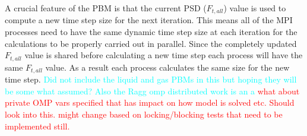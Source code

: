 \documentclass[preprint,11pt,authoryear]{elsarticle}
\begin{document}
    \par A crucial feature of the PBM is that the current PSD ($F_{t,all}$) value is used to compute a new time step size for the next iteration. This means all of the MPI processes need to have the same dynamic time step size at each iteration for the calculations to be properly carried out in parallel. Since the completely updated $F_{t,all}$ value is shared before calculating a new time step each process will have the same $F_{t,all}$ value. As a result each process calculates the same size for the new time step. 
\textcolor{cyan}{ Did not include the liquid and gas PBMs in this but hoping they will be some what assumed? Also the Ragg omp distributed work is an a}
\textcolor{red}{what about private OMP vars specified that has impact on how model is solved etc. Should look into this. might change based on locking/blocking tests that need to be implemented still.}   
\end{document}
